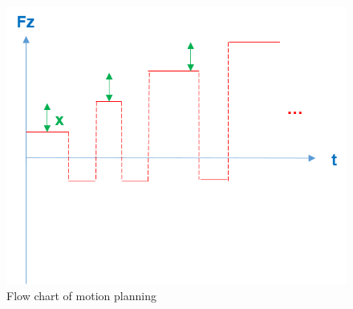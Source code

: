\begin{figure}[htbp]
\begin{center}
\includegraphics[width=0.5\linewidth]{Images/motion planning_motion.png}
\caption{
Flow chart of motion planning
}\label{fig:motion planning_motion}
\end{center}
\end{figure}
